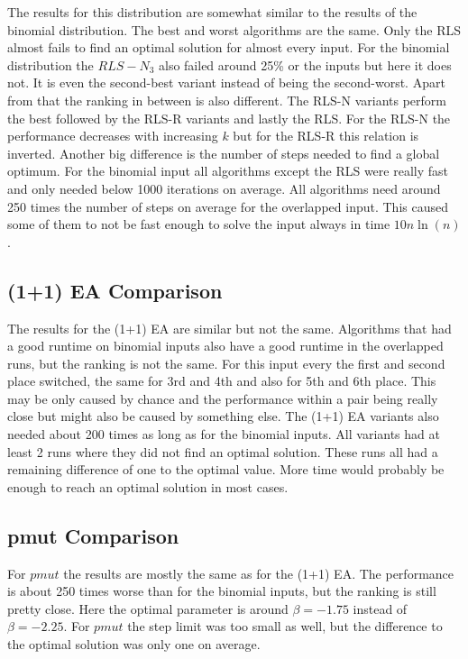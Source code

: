 The results for this distribution are somewhat similar to the results of the binomial distribution.
The best and worst algorithms are the same.
Only the RLS almost fails to find an optimal solution for almost every input.
For the binomial distribution the $RLS-N_3$ also failed around 25\% or the inputs but here it does not.
It is even the second-best variant instead of being the second-worst.
Apart from that the ranking in between is also different.
The RLS-N variants perform the best followed by the RLS-R variants and lastly the RLS.
For the RLS-N the performance decreases with increasing $k$ but for the RLS-R this relation is inverted.
Another big difference is the number of steps needed to find a global optimum.
For the binomial input all algorithms except the RLS were really fast and only needed below 1000 iterations on average.
All algorithms need around 250 times the number of steps on average for the overlapped input.
This caused some of them to not be fast enough to solve the input always in time $10n\ln(n)$.
\subsection{(1+1) EA Comparison}




The results for the (1+1) EA are similar but not the same.
Algorithms that had a good runtime on binomial inputs also have a good runtime in the overlapped runs, but the ranking is not the same.
For this input every the first and second place switched, the same for 3rd and 4th and also for 5th and 6th place.
This may be only caused by chance and the performance within a pair being really close but might also be caused by something else.
The (1+1) EA variants also needed about 200 times as long as for the binomial inputs.
All variants had at least 2 runs where they did not find an optimal solution.
These runs all had a remaining difference of one to the optimal value.
More time would probably be enough to reach an optimal solution in most cases.
\subsection{pmut Comparison}




For $pmut$ the results are mostly the same as for the (1+1) EA.
The performance is about 250 times worse than for the binomial inputs, but the ranking is still pretty close.
Here the optimal parameter is around $\beta=-1.75$ instead of $\beta=-2.25$.
For $pmut$ the step limit was too small as well, but the difference to the optimal solution was only one on average.
